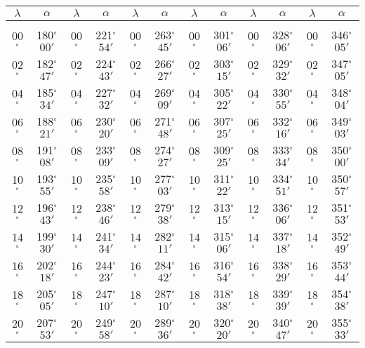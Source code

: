 \begin{table}
{\begin{tabular}{cc|cc|cc|cc|cc|cc}
$\lambda$& $\alpha$& $\lambda$& $\alpha$& $\lambda$& $\alpha$& $\lambda$& $\alpha$& $\lambda$& $\alpha$& $\lambda$& $\alpha$\\\hline
&&&&&&&&&&&\\[-2ex]
00$^\circ$ & 180$^\circ$$00'$ & 00$^\circ$ & 221$^\circ$$54'$ & 00$^\circ$ & 263$^\circ$$45'$ & 00$^\circ$ & 301$^\circ$$06'$ &  00$^\circ$ & 328$^\circ$$06'$ & 00$^\circ$ & 346$^\circ$$05'$\\
02$^\circ$ & 182$^\circ$$47'$ & 02$^\circ$ & 224$^\circ$$43'$ & 02$^\circ$ & 266$^\circ$$27'$ & 02$^\circ$ & 303$^\circ$$15'$ &  02$^\circ$ & 329$^\circ$$32'$ & 02$^\circ$ & 347$^\circ$$05'$\\
04$^\circ$ & 185$^\circ$$34'$ & 04$^\circ$ & 227$^\circ$$32'$ & 04$^\circ$ & 269$^\circ$$09'$ & 04$^\circ$ & 305$^\circ$$22'$ &  04$^\circ$ & 330$^\circ$$55'$ & 04$^\circ$ & 348$^\circ$$04'$\\
06$^\circ$ & 188$^\circ$$21'$ & 06$^\circ$ & 230$^\circ$$20'$ & 06$^\circ$ & 271$^\circ$$48'$ & 06$^\circ$ & 307$^\circ$$25'$ &  06$^\circ$ & 332$^\circ$$16'$ & 06$^\circ$ & 349$^\circ$$03'$\\
08$^\circ$ & 191$^\circ$$08'$ & 08$^\circ$ & 233$^\circ$$09'$ & 08$^\circ$ & 274$^\circ$$27'$ & 08$^\circ$ & 309$^\circ$$25'$ &  08$^\circ$ & 333$^\circ$$34'$ & 08$^\circ$ & 350$^\circ$$00'$\\
10$^\circ$ & 193$^\circ$$55'$ & 10$^\circ$ & 235$^\circ$$58'$ & 10$^\circ$ & 277$^\circ$$03'$ & 10$^\circ$ & 311$^\circ$$22'$ &  10$^\circ$ & 334$^\circ$$51'$ & 10$^\circ$ & 350$^\circ$$57'$\\
12$^\circ$ & 196$^\circ$$43'$ & 12$^\circ$ & 238$^\circ$$46'$ & 12$^\circ$ & 279$^\circ$$38'$ & 12$^\circ$ & 313$^\circ$$15'$ &  12$^\circ$ & 336$^\circ$$06'$ & 12$^\circ$ & 351$^\circ$$53'$\\
14$^\circ$ & 199$^\circ$$30'$ & 14$^\circ$ & 241$^\circ$$34'$ & 14$^\circ$ & 282$^\circ$$11'$ & 14$^\circ$ & 315$^\circ$$06'$ &  14$^\circ$ & 337$^\circ$$18'$ & 14$^\circ$ & 352$^\circ$$49'$\\
16$^\circ$ & 202$^\circ$$18'$ & 16$^\circ$ & 244$^\circ$$23'$ & 16$^\circ$ & 284$^\circ$$42'$ & 16$^\circ$ & 316$^\circ$$54'$ &  16$^\circ$ & 338$^\circ$$29'$ & 16$^\circ$ & 353$^\circ$$44'$\\
18$^\circ$ & 205$^\circ$$05'$ & 18$^\circ$ & 247$^\circ$$10'$ & 18$^\circ$ & 287$^\circ$$10'$ & 18$^\circ$ & 318$^\circ$$38'$ &  18$^\circ$ & 339$^\circ$$39'$ & 18$^\circ$ & 354$^\circ$$38'$\\
20$^\circ$ & 207$^\circ$$53'$ & 20$^\circ$ & 249$^\circ$$58'$ & 20$^\circ$ & 289$^\circ$$36'$ & 20$^\circ$ & 320$^\circ$$20'$ &  20$^\circ$ & 340$^\circ$$47'$ & 20$^\circ$ & 355$^\circ$$33'$\\

\end{tabular}}
\end{table}
